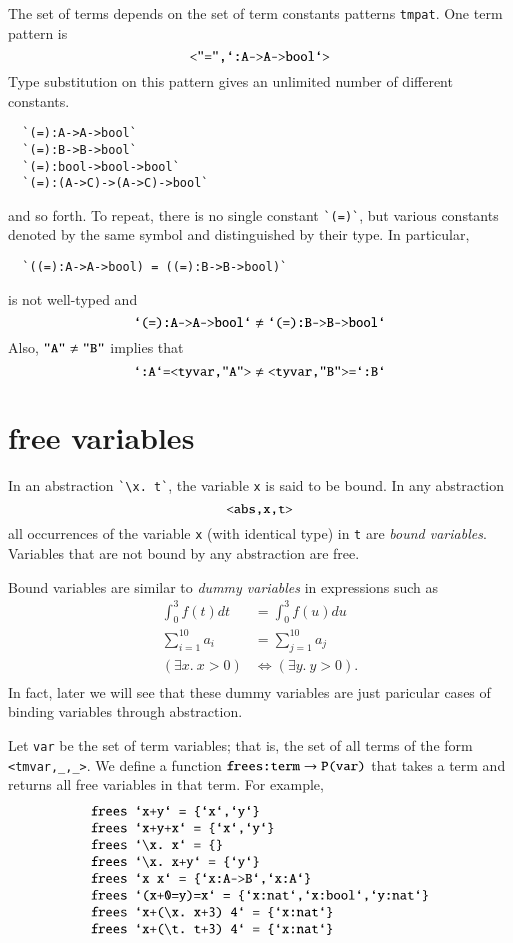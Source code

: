 The set of terms depends on the set of term constants patterns \verb!tmpat!.  One term pattern is
$$
\verb!<"=",`:A->A->bool`>!
$$
Type substitution on this pattern gives an unlimited number of different constants.
\begin{verbatim}
  `(=):A->A->bool`
  `(=):B->B->bool`
  `(=):bool->bool->bool`
  `(=):(A->C)->(A->C)->bool`
\end{verbatim}
and so forth.  To repeat, there is no single constant \verb!`(=)`!, but various constants denoted by the same symbol and distinguished by their type.
In particular,
\begin{verbatim}
  `((=):A->A->bool) = ((=):B->B->bool)`
\end{verbatim}
is not well-typed and
$$
\verb!`(=):A->A->bool`! \ne \verb!`(=):B->B->bool`!
$$
Also,
$\verb!"A"!\ne \verb!"B"!$ implies that
$$
\verb!`:A`=<tyvar,"A">!\ne\verb!<tyvar,"B">=`:B`!
$$ 
\section{free variables}

In an abstraction \verb!`\x. t`!, the variable \verb!x! is said to be
bound.  In any abstraction
$$
\verb!<abs,x,t>!
$$
all occurrences of the variable \verb!x! (with identical type) in \verb!t! are {\it bound variables}.  Variables that are not bound by any abstraction are free.

Bound variables are similar to {\it dummy variables} in expressions such as 
$$
\begin{array}{lll}
\int_0^3 f(t) dt &= \int_0^3 f(u) du\\
\sum_{i=1}^{10} a_i &= \sum_{j=1}^{10} a_j\\
(\exists x.~x>0)  &\Leftrightarrow (\exists y.~y>0).\\
\end{array}
$$
In fact, later we will see that these dummy variables are just paricular cases of binding variables through abstraction.

Let \verb!var! be the set of term variables; that is, the
set of all terms of the form \verb!<tmvar,_,_>!.
We define a function $\verb!frees:term!\to \verb!P(var)!$
that takes a term and returns all free variables in that term.  For example,
$$
\begin{array}{lll}
\verb!frees `x+y` = {`x`,`y`}!\\
\verb!frees `x+y+x` = {`x`,`y`}!\\
\verb!frees `\x. x` = {}!\\
\verb!frees `\x. x+y` = {`y`}!\\
\verb!frees `x x` = {`x:A->B`,`x:A`}!\\
\verb!frees `(x+0=y)=x` = {`x:nat`,`x:bool`,`y:nat`}!\\
\verb!frees `x+(\x. x+3) 4` = {`x:nat`}!\\
\verb!frees `x+(\t. t+3) 4` = {`x:nat`}!\\
\end{array}
$$

